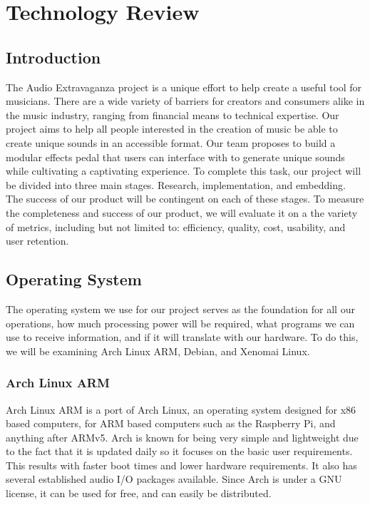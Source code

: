 \documentclass[onecolumn, draftclsnofoot,10pt, compsoc]{IEEEtran}
\begin{document}
\newpage
{}
\tableofcontents
\clearpage

\section{Technology Review}
    \subsection{Introduction}
    The Audio Extravaganza project is a unique effort to help create a useful tool for musicians. There are a wide variety of barriers for creators and consumers alike in the music industry, ranging from financial means to technical expertise. Our project aims to help all people interested in the creation of music be able to create unique sounds in an accessible format. Our team proposes to build a modular effects pedal that users can interface with to generate unique sounds while cultivating a captivating experience. To complete this task, our project will be divided into three main stages. Research, implementation, and embedding. The success of our product will be contingent on each of these stages. To measure the completeness and success of our product, we will evaluate it on a the variety of metrics, including but not limited to: efficiency, quality, cost, usability, and user retention.
    
    \subsection{Operating System}
    The operating system we use for our project serves as the foundation for all our operations, how much processing power will be required, what programs we can use to receive information, and if it will translate with our hardware. To do this, we will be examining Arch Linux ARM, Debian, and Xenomai Linux.
        \subsubsection{Arch Linux ARM}
        Arch Linux ARM is a port of Arch Linux, an operating system designed for x86 based computers, for ARM based computers such as the Raspberry Pi, and anything after ARMv5. Arch is known for being very simple and lightweight due to the fact that it is updated daily so it focuses on the basic user requirements. This results with faster boot times and lower hardware requirements. It also has several established audio I/O packages available. Since Arch is under a GNU license, it can be used for free, and can easily be distributed.
        
\end{document}
